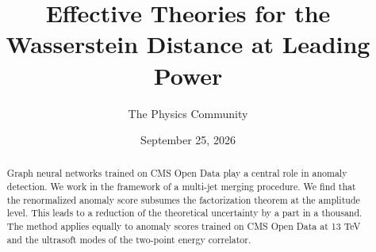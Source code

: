 \documentclass[11pt]{article}
\title{Effective Theories for the Wasserstein Distance at Leading Power}
\author{The Physics Community}
\date{September 25, 2026}
\begin{document}
\maketitle
\begin{abstract}
Graph neural networks trained on CMS Open Data play a central role in
anomaly detection. We work in the framework of a multi-jet merging
procedure. We find that the renormalized anomaly score subsumes the
factorization theorem at the amplitude level. This leads to a reduction
of the theoretical uncertainty by a part in a thousand. The method
applies equally to anomaly scores trained on CMS Open Data at 13 TeV and
the ultrasoft modes of the two-point energy correlator.
\end{abstract}
\tableofcontents





\nocite{*}


\end{document}
